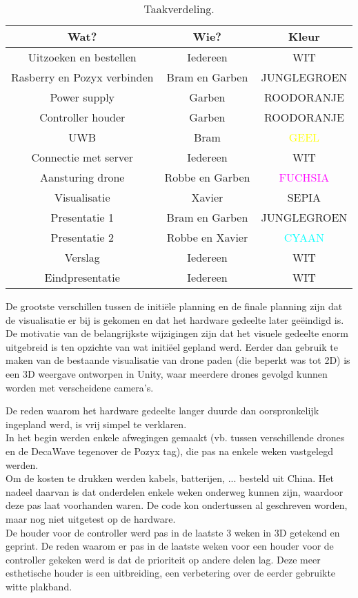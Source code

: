 \begin{table}[p]
	\centering
	\begin{tabular}{ |c|c|c| } \hline
		Wat? & Wie? & Kleur \\ [.5ex] \hline\hline
		Uitzoeken en bestellen & Iedereen & WIT \\ \hline
		Rasberry en Pozyx verbinden & Bram en Garben & \textcolor{JungleGreen}{JUNGLEGROEN} \\ \hline
		Power supply & Garben & \textcolor{RedOrange}{ROODORANJE} \\ \hline
		Controller houder & Garben & \textcolor{RedOrange}{ROODORANJE} \\ \hline
		UWB & Bram & \textcolor{Yellow}{GEEL} \\ \hline
		Connectie met server & Iedereen & WIT \\ \hline
		Aansturing drone & Robbe en Garben & \textcolor{Fuchsia}{FUCHSIA} \\ \hline
		Visualisatie & Xavier & \textcolor{Sepia}{SEPIA} \\ \hline
		Presentatie 1 & Bram en Garben & \textcolor{JungleGreen}{JUNGLEGROEN} \\ \hline
		Presentatie 2 & Robbe en Xavier & \textcolor{Cyan}{CYAAN} \\ \hline
		Verslag & Iedereen & WIT \\ \hline
		Eindpresentatie & Iedereen & WIT \\ \hline
	\end{tabular}
	\caption[Taakverdeling]{Taakverdeling.}
	\label{tab:taakverdeling}
\end{table}

De grootste verschillen tussen de initi\"ele planning en de finale planning zijn dat de visualisatie er bij is gekomen en dat het hardware gedeelte later ge\"eindigd is.\\

De motivatie van de belangrijkste wijzigingen zijn dat het visuele gedeelte enorm uitgebreid is ten opzichte van wat initi\"eel gepland werd.
Eerder dan gebruik te maken van de bestaande visualisatie van drone paden (die beperkt was tot 2D) is een 3D weergave ontworpen in Unity, waar meerdere drones gevolgd kunnen worden met verscheidene camera's.

De reden waarom het hardware gedeelte langer duurde dan oorspronkelijk ingepland werd, is vrij simpel te verklaren.\\
In het begin werden enkele afwegingen gemaakt (vb. tussen verschillende drones en de DecaWave tegenover de Pozyx tag), die pas na enkele weken vastgelegd werden.\\
Om de kosten te drukken werden kabels, batterijen, ... besteld uit China.
Het nadeel daarvan is dat onderdelen enkele weken onderweg kunnen zijn, waardoor deze pas laat voorhanden waren.
De code kon ondertussen al geschreven worden, maar nog niet uitgetest op de hardware.\\
De houder voor de controller werd pas in de laatste 3 weken in 3D getekend en geprint.
De reden waarom er pas in de laatste weken voor een houder voor de controller gekeken werd is dat de prioriteit op andere delen lag.
Deze meer esthetische houder is een uitbreiding, een verbetering over de eerder gebruikte witte plakband.